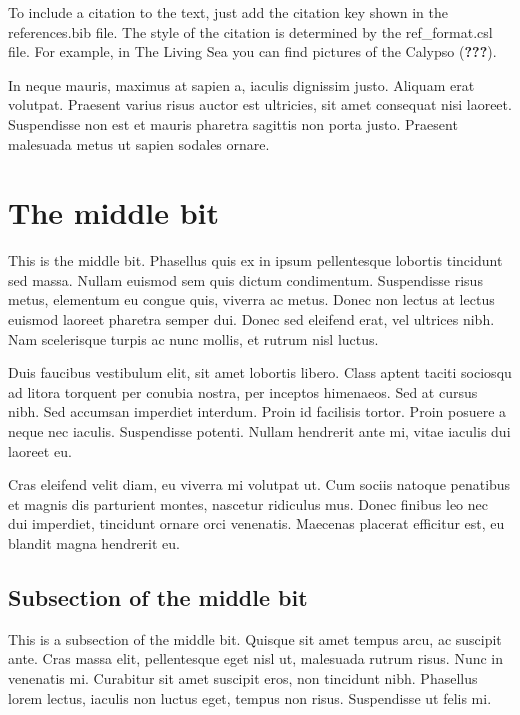 \documentclass[12pt,a4paperpaper,]{report}
\begin{document}
To include a citation to the text, just add the citation key shown in
the references.bib file. The style of the citation is determined by the
ref\_format.csl file. For example, in The Living Sea you can find
pictures of the Calypso ({\textbf{???}}).

In neque mauris, maximus at sapien a, iaculis dignissim justo. Aliquam
erat volutpat. Praesent varius risus auctor est ultricies, sit amet
consequat nisi laoreet. Suspendisse non est et mauris pharetra sagittis
non porta justo. Praesent malesuada metus ut sapien sodales ornare.

\section{The middle bit}\label{the-middle-bit}

This is the middle bit. Phasellus quis ex in ipsum pellentesque lobortis
tincidunt sed massa. Nullam euismod sem quis dictum condimentum.
Suspendisse risus metus, elementum eu congue quis, viverra ac metus.
Donec non lectus at lectus euismod laoreet pharetra semper dui. Donec
sed eleifend erat, vel ultrices nibh. Nam scelerisque turpis ac nunc
mollis, et rutrum nisl luctus.

Duis faucibus vestibulum elit, sit amet lobortis libero. Class aptent
taciti sociosqu ad litora torquent per conubia nostra, per inceptos
himenaeos. Sed at cursus nibh. Sed accumsan imperdiet interdum. Proin id
facilisis tortor. Proin posuere a neque nec iaculis. Suspendisse
potenti. Nullam hendrerit ante mi, vitae iaculis dui laoreet eu.

Cras eleifend velit diam, eu viverra mi volutpat ut. Cum sociis natoque
penatibus et magnis dis parturient montes, nascetur ridiculus mus. Donec
finibus leo nec dui imperdiet, tincidunt ornare orci venenatis. Maecenas
placerat efficitur est, eu blandit magna hendrerit eu.

\subsection{Subsection of the middle
bit}\label{subsection-of-the-middle-bit}

This is a subsection of the middle bit. Quisque sit amet tempus arcu, ac
suscipit ante. Cras massa elit, pellentesque eget nisl ut, malesuada
rutrum risus. Nunc in venenatis mi. Curabitur sit amet suscipit eros,
non tincidunt nibh. Phasellus lorem lectus, iaculis non luctus eget,
tempus non risus. Suspendisse ut felis mi.
\end{document}

